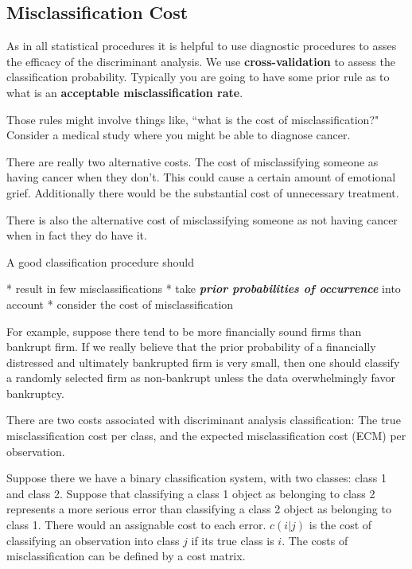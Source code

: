 
\subsection{Misclassification Cost}

As in all statistical procedures it is helpful to use diagnostic procedures to asses the efficacy of the discriminant analysis. We use \textbf{cross-validation} to assess the classification probability.
Typically you are going to have some prior rule as to what is an \textbf{acceptable misclassification rate}.

Those rules might involve things like, ``what is the cost of misclassification?" Consider a medical study where you might be able to diagnose cancer.

There are really two alternative costs. The cost of misclassifying someone as having cancer when they don't.
This could cause a certain amount of emotional grief. Additionally there would be the substantial cost of unnecessary treatment.

There is also the alternative cost of misclassifying someone as not having cancer when in fact they do have it.

A good classification procedure should
 
 * result in few misclassifications
 * take \textbf{\textit{prior probabilities of occurrence}} into account
 * consider the cost of misclassification
 
 
For example, suppose there tend to be more financially sound firms than bankrupt
firm. If we really believe that the prior probability of a financially
distressed and ultimately bankrupted firm is very small, then one should
classify a randomly selected firm as non-bankrupt unless the data
overwhelmingly favor bankruptcy.



There are two costs associated with discriminant analysis classification: The true misclassification cost per class, and the expected misclassification cost (ECM) per observation.

Suppose there we have a binary classification system, with two classes: class 1 and class 2.
Suppose that classifying a class 1 object as belonging to class 2 represents a more serious error than classifying a class 2 object as belonging to class 1. There would an assignable cost to each error.
$c(i|j)$ is the cost of classifying an observation into class $j$ if its true class is $i$.
The costs of misclassification can be defined by a cost matrix.

